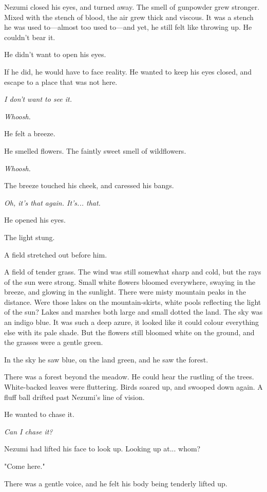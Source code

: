 Nezumi closed his eyes, and turned away. The smell of gunpowder grew
stronger. Mixed with the stench of blood, the air grew thick and
viscous. It was a stench he was used to---almost too used to---and yet, he
still felt like throwing up. He couldn't bear it.

He didn't want to open his eyes.

If he did, he would have to face reality. He wanted to keep his eyes
closed, and escape to a place that was not here.

\emph{I don't want to see it.}

\mybreak

\emph{Whoosh.}

He felt a breeze.

He smelled flowers. The faintly sweet smell of wildflowers.

\emph{Whoosh.}

The breeze touched his cheek, and caressed his bangs.

\emph{Oh, it's that again. It's... that.}

He opened his eyes.

The light stung.

A field stretched out before him.

A field of tender grass. The wind was still somewhat sharp and cold, but
the rays of the sun were strong. Small white flowers bloomed everywhere,
swaying in the breeze, and glowing in the sunlight. There were misty
mountain peaks in the distance. Were those lakes on the mountain-skirts,
white pools reflecting the light of the sun? Lakes and marshes both
large and small dotted the land. The sky was an indigo blue. It was such
a deep azure, it looked like it could colour everything else with its
pale shade. But the flowers still bloomed white on the ground, and the
grasses were a gentle green.

In the sky he saw blue, on the land green, and he saw the forest.

There was a forest beyond the meadow. He could hear the rustling of the
trees. White-backed leaves were fluttering. Birds soared up, and swooped
down again. A fluff ball drifted past Nezumi's line of vision.

He wanted to chase it.

\emph{Can I chase it?}

Nezumi had lifted his face to look up. Looking up at... whom?

"Come here."

There was a gentle voice, and he felt his body being tenderly lifted up.

